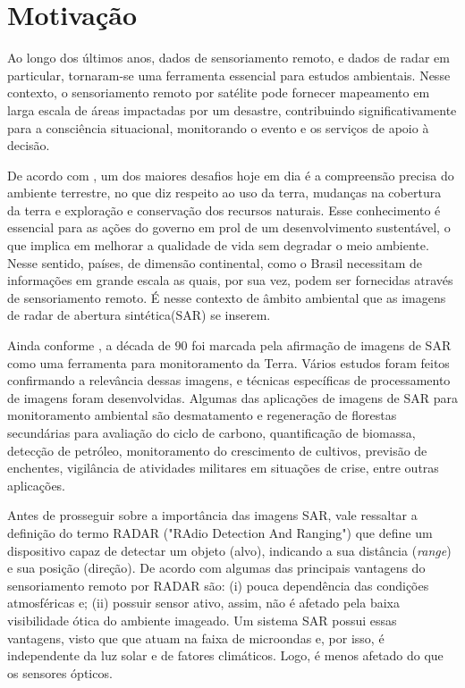  

\section{Motivação}

Ao longo dos últimos anos, dados de sensoriamento remoto, e dados de radar em particular, tornaram-se uma ferramenta essencial para estudos ambientais. Nesse contexto, o sensoriamento remoto por satélite pode fornecer mapeamento em larga escala de áreas impactadas por um desastre, contribuindo significativamente para a consciência situacional, monitorando o evento e os serviços de apoio à decisão. 

De acordo com \citet{Frery99}, um dos maiores desafios hoje em dia é a compreensão precisa do ambiente terrestre, no que diz respeito ao uso da terra, mudanças na cobertura da terra e exploração e conservação dos recursos naturais. Esse conhecimento é essencial para as ações do governo em prol de um desenvolvimento sustentável, o que implica em melhorar a qualidade de vida sem degradar o meio ambiente. Nesse sentido, países, de dimensão continental, como o Brasil necessitam de informações em grande escala as quais, por sua vez, podem ser fornecidas através de sensoriamento remoto. É nesse contexto de âmbito ambiental que as imagens de radar de abertura sintética(SAR) se inserem.

Ainda conforme \citet{Freitas2005}, a década de $90$ foi marcada pela afirmação de imagens de SAR como uma ferramenta para monitoramento da Terra. Vários estudos foram feitos confirmando a relevância dessas imagens, e técnicas específicas de processamento de imagens foram desenvolvidas. Algumas das aplicações de imagens de SAR para monitoramento ambiental são desmatamento e regeneração de florestas secundárias para avaliação do ciclo de carbono, quantificação de biomassa, detecção de petróleo, monitoramento do crescimento de cultivos, previsão de enchentes, vigilância de atividades militares em situações de crise, entre outras aplicações.

Antes de prosseguir sobre a importância das imagens SAR, vale ressaltar a definição do termo RADAR ("RAdio Detection And Ranging") que define um dispositivo capaz de detectar um objeto (alvo), indicando a sua distância (\textit{range}) e sua posição (direção). De acordo com \citet{Pottier2009} algumas das principais vantagens do sensoriamento remoto por RADAR são: (i) pouca dependência das condições atmosféricas e; (ii) possuir sensor ativo, assim, não é afetado pela baixa visibilidade ótica do ambiente imageado. Um sistema SAR possui essas vantagens, visto que que atuam na faixa de microondas e, por isso, é independente da luz solar e de fatores climáticos. Logo, é menos afetado do que os sensores ópticos. 

